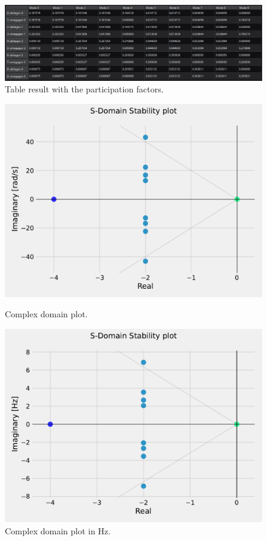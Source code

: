 \begin{figure}[H]
  \centering
  \includegraphics[width=1\linewidth]{figures/result_pfactors_GUI.png}
  \caption{Table result with the participation factors.}
  \label{fig:table_PF_GUI}
\end{figure}

\begin{figure}[H]
  \centering
  \begin{minipage}{0.49\textwidth}
    \centering
    \includegraphics[width=\linewidth]{figures/smallsignal_plot_GUI.pdf}
    \caption{Complex domain plot.}
    \label{fig:plot_ss_GUI}
  \end{minipage}
  \hfill
  \begin{minipage}{0.49\textwidth}
    \centering
    \includegraphics[width=\linewidth]{figures/smallsignal_plot_Hz_GUI.pdf}
    \caption{Complex domain plot in Hz.}
    \label{fig:plot_ss_Hz_GUI}
  \end{minipage}
\end{figure}

